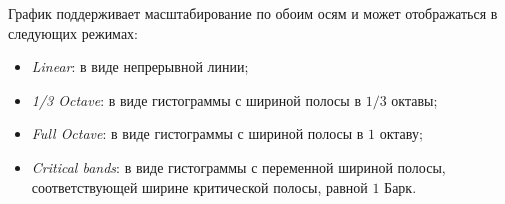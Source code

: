 \documentclass{beamer}
\begin{document}
\begin{frame}
График поддерживает масштабирование по обоим осям и может отображаться в следующих режимах:
\begin{itemize}
\item \textit{Linear}: в виде непрерывной линии;
\item \textit{1/3 Octave}: в виде гистограммы с шириной полосы в $1/3$ октавы; 
\item \textit{Full Octave}: в виде гистограммы с шириной полосы в $1$ октаву;
\item \textit{Critical bands}: в виде гистограммы с переменной шириной полосы, соответствующей ширине критической полосы, равной $1$ Барк. 
\end{itemize}

\end{frame}
\end{document}
